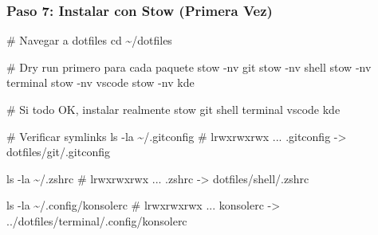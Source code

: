 \documentclass[
  doc,
  floatsintext,
  longtable,
  a4paper,
  nolmodern,
  notxfonts,
  notimes,
  12pt,
  colorlinks=true,linkcolor=blue,citecolor=blue,urlcolor=blue]{apa7}
\newenvironment{Shaded}{\begin{snugshade}}{\end{snugshade}}
\newcommand{\AttributeTok}[1]{\textcolor[rgb]{0.40,0.45,0.13}{#1}}
\newcommand{\BuiltInTok}[1]{\textcolor[rgb]{0.00,0.23,0.31}{#1}}
\newcommand{\CommentTok}[1]{\textcolor[rgb]{0.37,0.37,0.37}{#1}}
\newcommand{\ExtensionTok}[1]{\textcolor[rgb]{0.00,0.23,0.31}{#1}}
\newcommand{\FunctionTok}[1]{\textcolor[rgb]{0.28,0.35,0.67}{#1}}
\newcommand{\NormalTok}[1]{\textcolor[rgb]{0.00,0.23,0.31}{#1}}
\newcommand{\OperatorTok}[1]{\textcolor[rgb]{0.37,0.37,0.37}{#1}}
\newcommand{\StringTok}[1]{\textcolor[rgb]{0.13,0.47,0.30}{#1}}
\begin{document}
\begin{Shaded}
\end{Shaded}

\subsubsection{Paso 7: Instalar con Stow (Primera
Vez)}\label{paso-7-instalar-con-stow-primera-vez}

\begin{Shaded}
\begin{Highlighting}[]
\CommentTok{\# Navegar a dotfiles}
\BuiltInTok{cd}\NormalTok{ \textasciitilde{}/dotfiles}

\CommentTok{\# Dry run primero para cada paquete}
\ExtensionTok{stow} \AttributeTok{{-}nv}\NormalTok{ git}
\ExtensionTok{stow} \AttributeTok{{-}nv}\NormalTok{ shell}
\ExtensionTok{stow} \AttributeTok{{-}nv}\NormalTok{ terminal}
\ExtensionTok{stow} \AttributeTok{{-}nv}\NormalTok{ vscode}
\ExtensionTok{stow} \AttributeTok{{-}nv}\NormalTok{ kde}

\CommentTok{\# Si todo OK, instalar realmente}
\ExtensionTok{stow}\NormalTok{ git shell terminal vscode kde}

\CommentTok{\# Verificar symlinks}
\FunctionTok{ls} \AttributeTok{{-}la}\NormalTok{ \textasciitilde{}/.gitconfig}
\CommentTok{\# lrwxrwxrwx ... .gitconfig {-}\textgreater{} dotfiles/git/.gitconfig}

\FunctionTok{ls} \AttributeTok{{-}la}\NormalTok{ \textasciitilde{}/.zshrc}
\CommentTok{\# lrwxrwxrwx ... .zshrc {-}\textgreater{} dotfiles/shell/.zshrc}

\FunctionTok{ls} \AttributeTok{{-}la}\NormalTok{ \textasciitilde{}/.config/konsolerc}
\CommentTok{\# lrwxrwxrwx ... konsolerc {-}\textgreater{} ../dotfiles/terminal/.config/konsolerc}
\end{Highlighting}
\end{Shaded}
\end{document}
